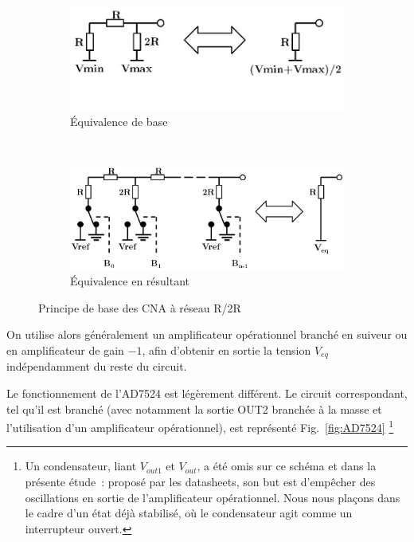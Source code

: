 \documentclass{article}
\begin{document}
\begin{figure}[h]
  \centering
  \begin{subfigure}[b]{0.43\textwidth}
    \centering
    \includegraphics[width=\textwidth]{R2Rbasics}
    \caption{Équivalence de base}
    \label{fig:R2Rbase1}
  \end{subfigure}
  ~~~~
  \begin{subfigure}[b]{0.53\textwidth}
    \centering
    \includegraphics[width=\textwidth]{R2Rexpended}
    \caption{Équivalence en résultant}
    \label{fig:R2Rbase2}
  \end{subfigure}
  \caption{Principe de base des CNA à réseau R/2R}
\end{figure}

On utilise alors généralement un amplificateur opérationnel branché en suiveur ou en amplificateur de gain $-1$, afin d'obtenir en sortie la tension $V_{eq}$ indépendamment du reste du circuit.


Le fonctionnement de l'AD7524 est légèrement différent. Le circuit correspondant, tel qu'il est branché (avec notamment la sortie OUT2 branchée à la masse et l'utilisation d'un amplificateur opérationnel), est représenté Fig.~\ref{fig:AD7524} \footnote{Un condensateur, liant $V_{out1}$ et $V_{out}$, a été omis sur ce schéma et dans la présente étude~: proposé par les datasheets, son but est d'empêcher des oscillations en sortie de l'amplificateur opérationnel. Nous nous plaçons dans le cadre d'un état déjà stabilisé, où le condensateur agit comme un interrupteur ouvert.}
\end{document}
